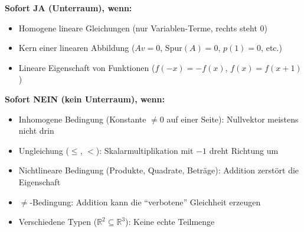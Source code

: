 \documentclass[a4paper,12pt]{article}
\begin{document}
\begin{merkbox}[title={Die goldenen Regeln f\"ur Unterraum-Aufgaben}]
\textbf{Sofort JA (Unterraum), wenn:}
\begin{itemize}
    \item Homogene lineare Gleichungen (nur Variablen-Terme, rechts steht $0$)
    \item Kern einer linearen Abbildung ($Av = 0$, $\mathrm{Spur}(A) = 0$, $p(1) = 0$, etc.)
    \item Lineare Eigenschaft von Funktionen ($f(-x) = -f(x)$, $f(x) = f(x+1)$)
\end{itemize}

\medskip
\textbf{Sofort NEIN (kein Unterraum), wenn:}
\begin{itemize}
    \item Inhomogene Bedingung (Konstante $\neq 0$ auf einer Seite): Nullvektor meistens nicht drin
    \item Ungleichung ($\leq$, $<$): Skalarmultiplikation mit $-1$ dreht Richtung um
    \item Nichtlineare Bedingung (Produkte, Quadrate, Betr\"age): Addition zerst\"ort die Eigenschaft
    \item $\neq$-Bedingung: Addition kann die ``verbotene'' Gleichheit erzeugen
    \item Verschiedene Typen ($\mathbb{R}^2 \subseteq \mathbb{R}^3$): Keine echte Teilmenge
\end{itemize}
\end{merkbox}
\end{document}
